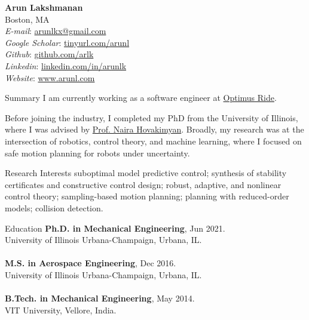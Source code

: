 \documentclass[9pt]{article}
\begin{document}
\begin{rsection}{}
\textbf{\large Arun Lakshmanan} \\
Boston, MA 
\vspace{0.5em} \\
\textit{E-mail}: \href{mailto:arunlkx@gmail.com}{arunlkx@gmail.com} \\
\textit{Google Scholar}: \href{https://tinyurl.com/arunl}{tinyurl.com/arunl} \\
\textit{Github}: \href{https://github.com/arlk}{github.com/arlk} \\
\textit{Linkedin}: \href{https://www.linkedin.com/in/arunlk/}{linkedin.com/in/arunlk} \\
\textit{Website}: \href{https://www.arunl.com}{www.arunl.com} 
\end{rsection}

\begin{rsection}{Summary}
I am currently working as a software engineer at \href{https://optimusride.com}{Optimus Ride}. 

Before joining the industry, I completed my PhD from the University of Illinois, where I was advised by \href{https://naira-hovakimyan.mechse.illinois.edu/}{Prof. Naira Hovakimyan}. Broadly, my research was at the intersection of robotics, control theory, and machine learning, where I focused on safe motion planning for robots under uncertainty. 
\end{rsection}

\begin{rsection}{Research Interests}
suboptimal model predictive control; synthesis of stability certificates and constructive control design; robust, adaptive, and nonlinear control theory; sampling-based motion planning; planning with reduced-order models; collision detection.
\end{rsection}

\begin{rsection}{Education}
    \textbf{Ph.D. in Mechanical Engineering}, Jun 2021. \\
    University of Illinois Urbana-Champaign, Urbana, IL. \\ \\
    \textbf{M.S. in Aerospace Engineering}, Dec 2016. \\
    University of Illinois Urbana-Champaign, Urbana, IL. \\ \\
    \textbf{B.Tech. in Mechanical Engineering}, May 2014. \\
    VIT University, Vellore, India.
\end{rsection}
\end{document}
